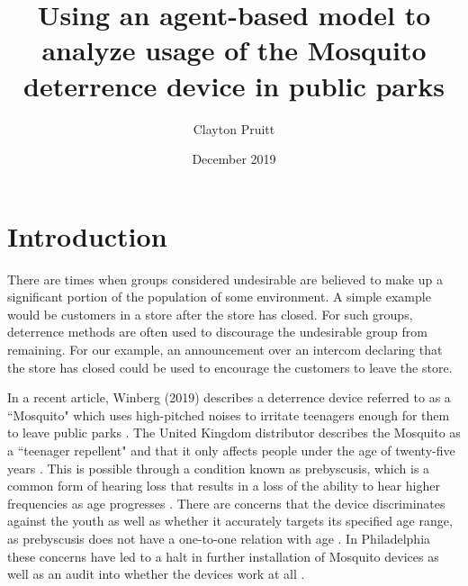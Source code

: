 \documentclass[twocolumn,11pt]{article}
\title{Using an agent-based model to analyze usage of the Mosquito deterrence device in public parks}
\author{Clayton Pruitt}
\date{December 2019}
\begin{document}
\pagestyle{plain}

\maketitle

\section*{Introduction}
There are times when groups considered undesirable are believed to make up a significant portion of the population of some environment. A simple example would be customers in a store after the store has closed. For such groups, deterrence methods are often used to discourage the undesirable group from remaining. For our example, an announcement over an intercom declaring that the store has closed could be used to encourage the customers to leave the store. 

In a recent article, Winberg (2019) describes a deterrence device referred to as a ``Mosquito" which uses high-pitched noises to irritate teenagers enough for them to leave public parks \citep{billypenn}. The United Kingdom distributor describes the Mosquito as a ``teenager repellent" and that it only affects people under the age of twenty-five years \citep{mosquitospecs}. This is possible through a condition known as prebyscusis, which is a common form of hearing loss that results in a loss of the ability to hear higher frequencies as age progresses \citep{prebyscusis}. There are concerns that the device discriminates against the youth as well as whether it accurately targets its specified age range, as prebyscusis does not have a one-to-one relation with age \citep{hearingthreshold}. In Philadelphia these concerns have led to a halt in further installation of Mosquito devices as well as an audit into whether the devices work at all \citep{billypenn}.
\end{document}
